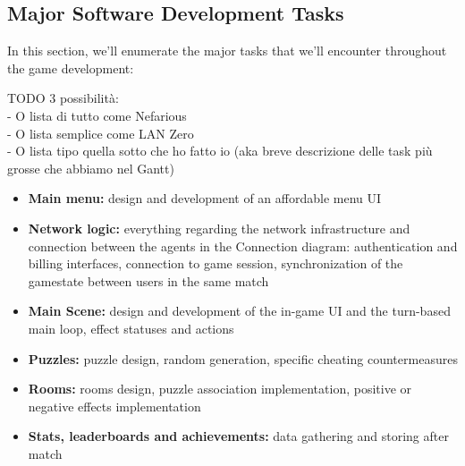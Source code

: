 \subsection{Major Software Development Tasks}
In this section, we'll enumerate the major tasks that we'll encounter throughout the game development:

TODO 3 possibilità:\\
- O lista di tutto come Nefarious\\
- O lista semplice come LAN Zero\\
- O lista tipo quella sotto che ho fatto io (aka breve descrizione delle task più grosse che abbiamo nel Gantt)

\begin {itemize}	
	\item \textbf{Main menu:} design and development of an affordable menu UI
	\item \textbf{Network logic: } everything regarding the network infrastructure and connection between the agents in the Connection diagram: authentication and billing interfaces, connection to game session, synchronization of the gamestate between users in the same match
	\item \textbf{Main Scene:}  design and development of the in-game UI and the turn-based main loop, effect statuses and actions
	\item \textbf{Puzzles:}  puzzle design, random generation, specific cheating countermeasures
	\item \textbf{Rooms:}  rooms design, puzzle association implementation, positive or negative effects implementation
	\item \textbf{Stats, leaderboards and achievements:} data gathering and storing after match
\end {itemize}


\pagebreak 